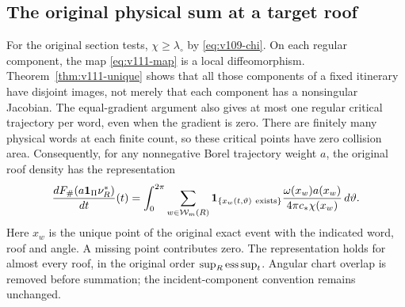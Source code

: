 \subsection{The original physical sum at a target roof}
For the original section tests, $\chi\ge\lambda_\circ$ by
\eqref{eq:v109-chi}. On each regular component, the map
\eqref{eq:v111-map} is a local diffeomorphism. Theorem~\ref{thm:v111-unique}
shows that all those components of a fixed itinerary have disjoint
images, not merely that each component has a nonsingular Jacobian.
The equal-gradient argument also gives at most one regular critical
trajectory per word, even when the gradient is zero. There are
finitely many physical words at each finite count, so these critical
points have zero collision area. Consequently, for any nonnegative
Borel trajectory weight $a$, the
original roof density has the representation
\begin{equation}\label{eq:v111-roof-sum}
 \frac{dF_\#(a\mathbf1_\Pi\nu_R^*)}{dt}(t)
  =\int_0^{2\pi}\sum_{w\in\mathcal W_m(R)}
       \mathbf1_{\{x_w(t,\vartheta)\ \mathrm{exists}\}}
       \frac{\omega(x_w)a(x_w)}{4\pi c_*\chi(x_w)}\,d\vartheta.
\end{equation}
Here $x_w$ is the unique point of the original exact event with the
indicated word, roof and angle. A missing point contributes zero.
The representation holds for almost every roof, in the original
order $\sup_R\operatorname*{ess\,sup}_t$. Angular chart overlap is removed before
summation; the incident-component convention remains unchanged.

